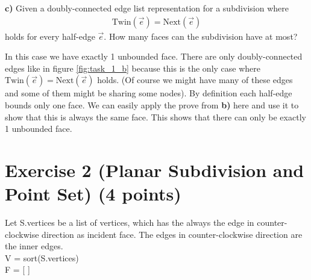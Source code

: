 \documentclass[english, fontsize=12pt, paper=a4, twoside=false, draft=true, pagesize=auto, version=last, DIV=16]{scrartcl}
\theoremstyle{break}
\begin{document}
\textbf{c)} Given a doubly-connected edge list representation for a subdivision where
\begin{align*}
\text{Twin}(\vec{e}) = \text{Next}(\vec{e})
\end{align*}
holds for every half-edge $\vec{e}$. How many faces can the subdivision have at most? \par
\medskip
In this case we have exactly 1 unbounded face. There are only doubly-connected edges like in figure \ref{fig:task_1_b} because this is the only case where $\text{Twin}(\vec{e}) = \text{Next}(\vec{e})$ holds. (Of course we might have many of these edges and some of them might be sharing some nodes). By definition each half-edge bounds only one face. We can easily apply the prove from \textbf{b)} here and use it to show that this is always the same face. This shows that there can only be exactly 1 unbounded face.

\vspace*{10mm}
\newpage




\section*{Exercise 2 (Planar Subdivision and Point Set) {\large \hfill (4 points)}}

Let S.vertices be a list of vertices, which has the always the edge in counter-clockwise direction as incident face. The edges in counter-clockwise direction are the inner edges.\\

V = sort(S.vertices)\\
F = [ ]\\
\end{document}
